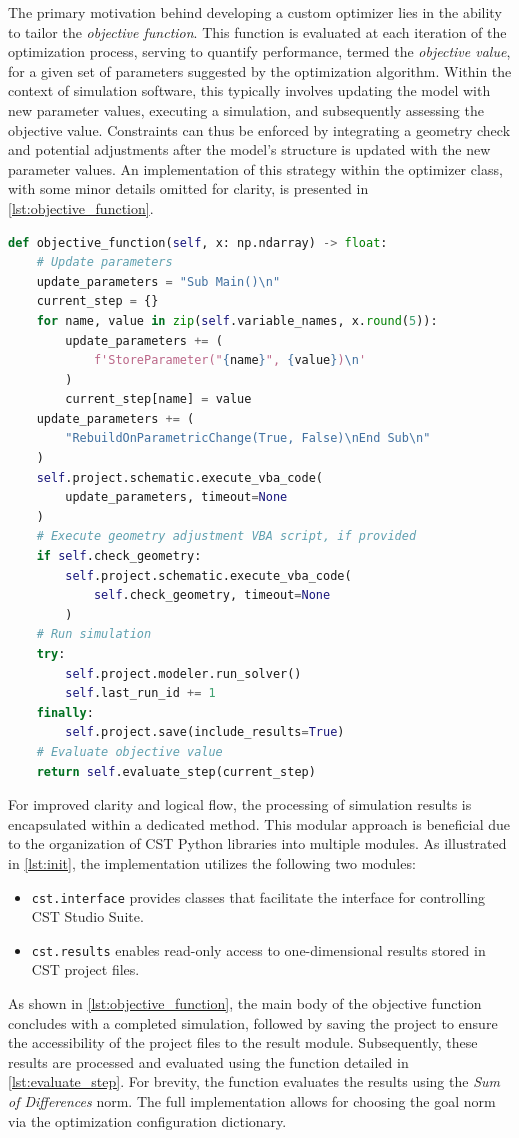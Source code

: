 \documentclass[11pt,a4paper,twoside,openany]{report}
\begin{document}
The primary motivation behind developing a custom optimizer lies in the ability to tailor the \emph{objective function}. This function is evaluated at each iteration of the optimization process, serving to quantify performance, termed the \emph{objective value}, for a given set of parameters suggested by the optimization algorithm. Within the context of simulation software, this typically involves updating the model with new parameter values, executing a simulation, and subsequently assessing the objective value. Constraints can thus be enforced by integrating a geometry check and potential adjustments after the model's structure is updated with the new parameter values. An implementation of this strategy within the optimizer class, with some minor details omitted for clarity, is presented in \cref{lst:objective_function}.

\begin{lstlisting}[caption={Objective function}, label={lst:objective_function}, language=Python]
def objective_function(self, x: np.ndarray) -> float:
    # Update parameters
    update_parameters = "Sub Main()\n"
    current_step = {}
    for name, value in zip(self.variable_names, x.round(5)):
        update_parameters += (
            f'StoreParameter("{name}", {value})\n'
        )
        current_step[name] = value
    update_parameters += (
        "RebuildOnParametricChange(True, False)\nEnd Sub\n"
    )
    self.project.schematic.execute_vba_code(
        update_parameters, timeout=None
    )
    # Execute geometry adjustment VBA script, if provided
    if self.check_geometry:
        self.project.schematic.execute_vba_code(
            self.check_geometry, timeout=None
        )
    # Run simulation
    try:
        self.project.modeler.run_solver()
        self.last_run_id += 1
    finally:
        self.project.save(include_results=True)
    # Evaluate objective value
    return self.evaluate_step(current_step)
\end{lstlisting}

For improved clarity and logical flow, the processing of simulation results is encapsulated within a dedicated method. This modular approach is beneficial due to the organization of CST Python libraries into multiple modules. As illustrated in \cref{lst:init}, the implementation utilizes the following two modules:
\begin{itemize}
    \item \texttt{cst.interface} provides classes that facilitate the interface for controlling CST Studio Suite.
    \item \texttt{cst.results} enables read-only access to one-dimensional results stored in CST project files.
\end{itemize}
As shown in \cref{lst:objective_function}, the main body of the objective function concludes with a completed simulation, followed by saving the project to ensure the accessibility of the project files to the result module. Subsequently, these results are processed and evaluated using the function detailed in \cref{lst:evaluate_step}. For brevity, the function evaluates the results using the \emph{Sum of Differences} norm. The full implementation allows for choosing the goal norm 
via the optimization configuration dictionary.
\end{document}
